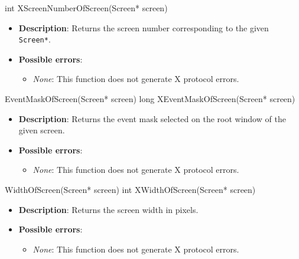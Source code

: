 \documentclass{report}
\begin{document}
\begin{itemize}
        \begin{cppcode}
            int XScreenNumberOfScreen(Screen* screen)
        \end{cppcode}
        \begin{itemize}
            \item \textbf{Description}: Returns the screen number corresponding to the given \texttt{Screen*}.
            \item \textbf{Possible errors}:
                \begin{itemize}
                    \item \textit{None}: This function does not generate X protocol errors.
                \end{itemize}
        \end{itemize}

        \begin{cppcode}
            EventMaskOfScreen(Screen* screen)
            long XEventMaskOfScreen(Screen* screen)
        \end{cppcode}
        \begin{itemize}
            \item \textbf{Description}: Returns the event mask selected on the root window of the given screen.
            \item \textbf{Possible errors}:
                \begin{itemize}
                    \item \textit{None}: This function does not generate X protocol errors.
                \end{itemize}
        \end{itemize}

        \begin{cppcode}
            WidthOfScreen(Screen* screen)
            int XWidthOfScreen(Screen* screen)
        \end{cppcode}
        \begin{itemize}
            \item \textbf{Description}: Returns the screen width in pixels.
            \item \textbf{Possible errors}:
                \begin{itemize}
                    \item \textit{None}: This function does not generate X protocol errors.
                \end{itemize}
        \end{itemize}


\end{itemize}
\end{document}
